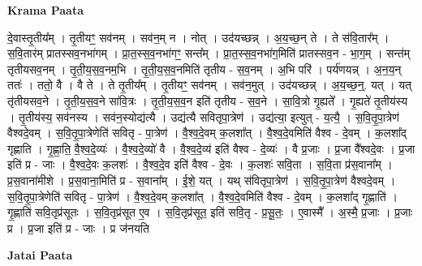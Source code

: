 \documentclass[17pt]{extarticle}
\begin{document}
\textbf{Krama Paata} \newline

दे॒वास्तृ॒तीय᳚म् । तृ॒तीयꣳ॒॒ सव॑नम् । सव॑न॒म् न । नोत् । उद॑यच्छन्न् । अ॒य॒च्छ॒न् ते । ते स॑वि॒तार᳚म् । स॒वि॒तार॑म् प्रातस्सव॒नभा॑गम् । प्रा॒त॒स्स॒व॒नभा॑गꣳ॒॒ सन्त᳚म् । प्रा॒त॒स्स॒व॒नभा॑ग॒मिति॑ प्रातस्सव॒न - भा॒ग॒म् । सन्त॑म् तृतीयसव॒नम् । तृ॒ती॒य॒स॒व॒नम॒भि । तृ॒ती॒य॒स॒व॒नमिति॑ तृतीय - स॒व॒नम् । अ॒भि परि॑ । पर्य॑णयन्न् । अ॒न॒य॒न् ततः॑ । ततो॒ वै । वै ते । ते तृ॒तीय᳚म् । तृ॒तीयꣳ॒॒ सव॑नम् । सव॑न॒मुत् । उद॑यच्छन्न् । अ॒य॒च्छ॒न्॒. यत् । यत् तृ॑तीयसव॒ने । तृ॒ती॒य॒स॒व॒ने सा॑वि॒त्रः । तृ॒ती॒य॒स॒व॒न इति॑ तृतीय - स॒व॒ने । सा॒वि॒त्रो गृ॒ह्यते᳚ । गृ॒ह्यते॑ तृ॒तीय॑स्य । तृ॒तीय॑स्य॒ सव॑नस्य । सव॑न॒स्योद्य॑त्यै । उद्य॑त्यै सवितृपा॒त्रेण॑ । उद्य॑त्या॒ इत्युत् - य॒त्यै॒ । स॒वि॒तृ॒पा॒त्रेण॑ वैश्वदे॒वम् । स॒वि॒तृ॒पा॒त्रेणेति॑ सवितृ - पा॒त्रेण॑ । वै॒श्व॒दे॒वम् क॒लशा᳚त् । वै॒श्व॒दे॒वमिति॑ वैश्व - दे॒वम् । क॒लशा᳚द् गृह्णाति । गृ॒ह्णा॒ति॒ वै॒श्व॒दे॒व्यः॑ । वै॒श्व॒दे॒व्यो॑ वै । वै॒श्व॒दे॒व्य॑ इति॑ वैश्व - दे॒व्यः॑ । वै प्र॒जाः । प्र॒जा वै᳚श्वदे॒वः । प्र॒जा इति॑ प्र - जाः । वै॒श्व॒दे॒वः क॒लशः॑ । वै॒श्व॒दे॒व इति॑ वैश्व - दे॒वः । क॒लशः॑ सवि॒ता । स॒वि॒ता प्र॑स॒वाना᳚म् । प्र॒स॒वाना॑मीशे । प्र॒स॒वाना॒मिति॑ प्र - स॒वाना᳚म् । ई॒शे॒ यत् । यथ् स॑वितृपा॒त्रेण॑ । स॒वि॒तृ॒पा॒त्रेण॑ वैश्वदे॒वम् । स॒वि॒तृ॒पा॒त्रेणेति॑ सवितृ - पा॒त्रेण॑ । वै॒श्व॒दे॒वम् क॒लशा᳚त् । वै॒श्व॒दे॒वमिति॑ वैश्व - दे॒वम् । क॒लशा᳚द् गृ॒ह्णाति॑ । गृ॒ह्णाति॑ सवि॒तृप्र॑सूतः । स॒वि॒तृप्र॑सूत ए॒व । 
स॒वि॒तृप्र॑सूत॒ इति॑ सवि॒तृ - प्र॒सू॒तः॒ । ए॒वास्मै᳚ । अ॒स्मै॒ प्र॒जाः । प्र॒जाः प्र । प्र॒जा इति॑ प्र - जाः । प्र ज॑नयति \newline

\textbf{Jatai Paata} \newline
\end{document}
